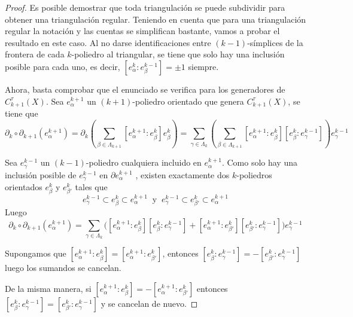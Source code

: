 \begin{proof}
    Es posible demostrar que toda triangulación se puede subdividir para obtener una triangulación regular. Teniendo en cuenta que para una triangulación regular la notación y las cuentas se simplifican bastante, vamos a probar el resultado en este caso. Al no darse identificaciones entre $(k-1)$-símplices de la frontera de cada $k$-poliedro al triangular, se tiene que solo hay una inclusión posible para cada uno, es decir, $[e^k_{\alpha} : e^{k-1}_{\beta}]=\pm 1$ siempre.

    Ahora, basta comprobar que el enunciado se verifica para los generadores de $C^{\tau}_{k+1}(X)$. Sea $e^{k+1}_{\alpha}$ un $(k+1)$-poliedro orientado que genera $C^{\tau}_{k+1}(X)$, se tiene que
    \begin{equation*}
        \partial_{k}\circ\partial_{k+1}(e^{k+1}_{\alpha}) = \partial_{k}\left( \sum_{\beta\in\Lambda_{k+1}} [e^{k+1}_{\alpha} : e^{k}_{\beta}]e^{k}_{\beta} \right) = \sum_{\gamma\in\Lambda_{k}} \left( \sum_{\beta\in\Lambda_{k+1}} [e^{k+1}_{\alpha} : e^{k}_{\beta}][e^{k}_{\beta} : e^{k-1}_{\gamma}] \right) e^{k-1}_{\gamma}
    \end{equation*}
    
    Sea $e^{k-1}_{\gamma}$ un $(k-1)$-poliedro cualquiera incluido en $e^{k+1}_{\alpha}$. Como solo hay una inclusión posible de $e^{k-1}_{\gamma}$ en $\partial e^{k+1}_{\alpha}$ , existen exactamente dos $k$-poliedros orientados $e^{k}_{\beta}$ y $e^{k}_{\beta'}$ tales que 
    \begin{equation*}
        e^{k-1}_{\gamma}\subset e^{k}_{\beta} \subset e^{k+1}_{\alpha}~\text{ y }~ e^{k-1}_{\gamma}\subset e^{k}_{\beta'}\subset e^{k+1}_{\alpha}
    \end{equation*}
    Luego
    \begin{equation*}
        \partial_{k}\circ\partial_{k+1}(e^{k+1}_{\alpha}) = \sum_{\gamma\in\Lambda_{k}}\big( [e^{k+1}_{\alpha} : e^{k}_{\beta}][e^{k}_{\beta} : e^{k-1}_{\gamma}] + [e^{k+1}_{\alpha} : e^{k}_{\beta'}][e^{k}_{\beta'} : e^{k-1}_{\gamma}] \big) e^{k-1}_{\gamma}
    \end{equation*}

    Supongamos que $[e^{k+1}_{\alpha} : e^{k}_{\beta}]=[e^{k+1}_{\alpha} : e^{k}_{\beta'}]$, entonces $[e^{k}_{\beta} : e^{k-1}_{\gamma}]=-[e^{k}_{\beta'} : e^{k-1}_{\gamma}]$ luego los sumandos se cancelan.

    De la misma manera, si $[e^{k+1}_{\alpha} : e^{k}_{\beta}]=-[e^{k+1}_{\alpha} : e^{k}_{\beta'}]$ entonces $[e^{k}_{\beta} : e^{k-1}_{\gamma}]=[e^{k}_{\beta'} : e^{k-1}_{\gamma}]$ y se cancelan de nuevo. 

\end{proof}

